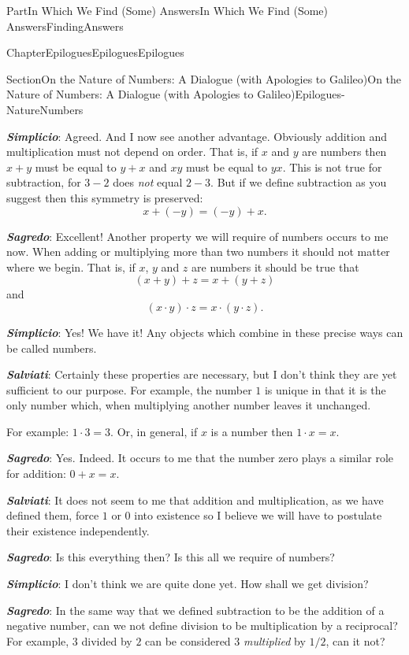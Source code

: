 \documentclass[oneside,10pt,]{book}
\newcommand{\alert}[1]{\textbf{\textit{#1}}}
\numberwithin{equation}{part}
\begin{document}
\begin{partptx}{Part}{In Which We Find (Some) Answers}{}{In Which We Find (Some) Answers}{}{}{FindingAnswers}
\begin{chapterptx}{Chapter}{Epilogues}{}{Epilogues}{}{}{Epilogues}
\begin{sectionptx}{Section}{On the Nature of Numbers: A Dialogue (with Apologies to Galileo)}{}{On the Nature of Numbers: A Dialogue (with Apologies to Galileo)}{}{}{Epilogues-NatureNumbers}
\begin{introduction}{}
\par
\alert{Simplicio}:  Agreed. And I now see another advantage. Obviously addition and multiplication must not depend on order. That is, if \(x\) and \(y\) are numbers then \(x+y\) must be equal to \(y+x\) and \(xy\) must be equal to \(yx\). This is not true for subtraction, for \(3-2\) does \emph{not} equal \(2-3\). But if we define subtraction as you suggest then this symmetry is preserved:%
\begin{equation*}
x+(-y) = (-y)+x\text{.}
\end{equation*}
%
\par
\alert{Sagredo}:  Excellent! Another property we will require of numbers occurs to me now. When adding or multiplying more than two numbers it should not matter where we begin. That is, if \(x\), \(y\) and \(z\) are numbers it should be true that%
\begin{equation*}
(x+y)+z = x+(y+z)
\end{equation*}
and%
\begin{equation*}
(x\cdot y)\cdot z = x\cdot(y\cdot z)\text{.}
\end{equation*}
%
\par
\alert{Simplicio}:  Yes! We have it! Any objects which combine in these precise ways can be called numbers.%
\par
\alert{Salviati}:  Certainly these properties are necessary, but I don't think they are yet sufficient to our purpose. For example, the number \(1\) is unique in that it is the only number which, when multiplying another number leaves it unchanged.%
\par
For example:  \(1\cdot3=3\). Or, in general, if \(x\) is a number then \(1\cdot x =x\).%
\par
\alert{Sagredo}:  Yes. Indeed. It occurs to me that the number zero plays a similar role for addition: \(0+x=x\).%
\par
\alert{Salviati}:  It does not seem to me that addition and multiplication, as we have defined them, force \(1\) or \(0\) into existence so I believe we will have to postulate their existence independently.%
\par
\alert{Sagredo}:  Is this everything then? Is this all we require of numbers?%
\par
\alert{Simplicio}:  I don't think we are quite done yet. How shall we get division?%
\par
\alert{Sagredo}:  In the same way that we defined subtraction to be the addition of a negative number, can we not define division to be multiplication by a reciprocal? For example, \(3\) divided by \(2\) can be considered \(3\) \emph{multiplied} by \(1/2\), can it not?%

\end{introduction}
\end{sectionptx}
\end{chapterptx}
\end{partptx}
\end{document}
